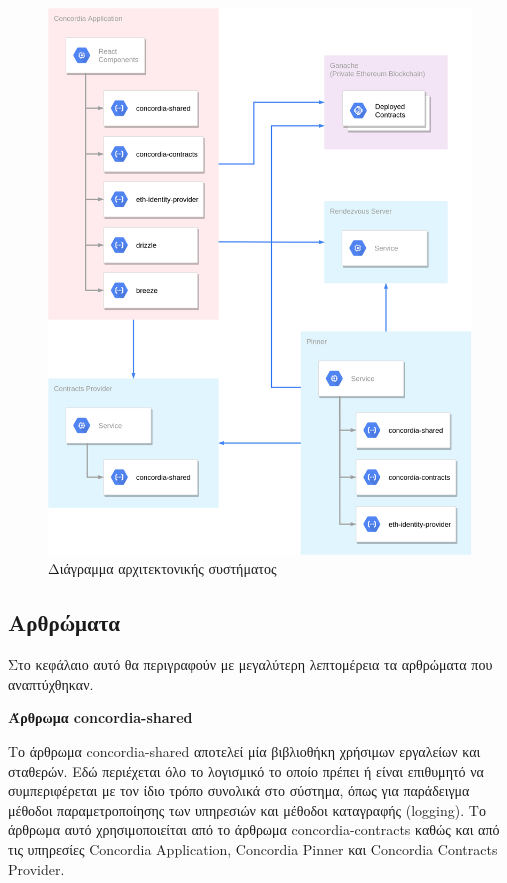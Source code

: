 \begin{figure}[H]
    \centering
    \includegraphics[width=.75\textwidth]{assets/figures/chapter-4/4.4.architecture-architecture-overview.png}
    \caption{Διάγραμμα αρχιτεκτονικής συστήματος}
    \label{figure:4-4-architecture-overview}
\end{figure}

\subsection{Αρθρώματα} \label{subsection:4-4-software-units}

Στο κεφάλαιο αυτό θα περιγραφούν με μεγαλύτερη λεπτομέρεια τα αρθρώματα που αναπτύχθηκαν.

\vspace{0.5cm}
\textbf{Άρθρωμα concordia-shared}

Το άρθρωμα concordia-shared αποτελεί μία βιβλιοθήκη χρήσιμων εργαλείων και σταθερών. Εδώ περιέχεται όλο το λογισμικό το οποίο πρέπει ή είναι επιθυμητό να συμπεριφέρεται με τον ίδιο τρόπο συνολικά στο σύστημα, όπως για παράδειγμα μέθοδοι παραμετροποίησης των υπηρεσιών και μέθοδοι καταγραφής (logging). Το άρθρωμα αυτό χρησιμοποιείται από το άρθρωμα concordia-contracts καθώς και από τις υπηρεσίες Concordia Application, Concordia Pinner και Concordia Contracts Provider.

